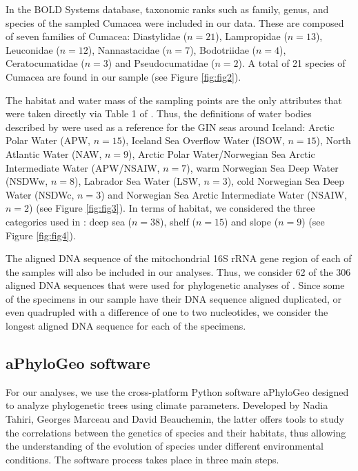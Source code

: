 In the BOLD Systems database, taxonomic ranks such as family, genus, and species of the sampled Cumacea were included in our data. These are composed of seven families of Cumacea: Diastylidae (\( n=21 \)), Lampropidae (\( n=13 \)), Leuconidae (\( n=12 \)), Nannastacidae (\( n=7 \)), Bodotriidae (\( n=4 \)), Ceratocumatidae (\( n=3 \)) and Pseudocumatidae (\( n=2 \)). A total of 21 species of Cumacea are found in our sample (see Figure \ref{fig:fig2}).

The habitat and water mass of the sampling points are the only attributes that were taken directly via Table 1 of \citep{uhlir_adding_2021}. Thus, the definitions of water bodies described by \citep{ostmann_marine_2014} were used as a reference for the GIN seas around Iceland: Arctic Polar Water (APW, \( n=15 \)), Iceland Sea Overflow Water (ISOW, \( n=15 \)), North Atlantic Water (NAW, \( n=9 \)), Arctic Polar Water/Norwegian Sea Arctic Intermediate Water (APW/NSAIW, \( n=7 \)), warm Norwegian Sea Deep Water (NSDWw, \( n=8 \)), Labrador Sea Water (LSW, \( n=3 \)), cold Norwegian Sea Deep Water (NSDWc, \( n=3 \)) and Norwegian Sea Arctic Intermediate Water (NSAIW, \( n=2 \)) (see Figure \ref{fig:fig3}). In terms of habitat, we considered the three categories used in \citep{uhlir_adding_2021}: deep sea (\( n=38 \)), shelf (\( n=15 \)) and slope (\( n=9 \)) (see Figure \ref{fig:fig4}).

The aligned DNA sequence of the mitochondrial 16S rRNA gene region of each of the samples will also be included in our analyses. Thus, we consider 62 of the 306 aligned DNA sequences that were used for phylogenetic analyses of \citep{uhlir_adding_2021}. Since some of the specimens in our sample have their DNA sequence aligned duplicated, or even quadrupled with a difference of one to two nucleotides, we consider the longest aligned DNA sequence for each of the specimens.

\subsection{aPhyloGeo software}

For our analyses, we use the cross-platform Python software aPhyloGeo designed to analyze phylogenetic trees using climate parameters. Developed by Nadia Tahiri, Georges Marceau and David Beauchemin, the latter offers tools to study the correlations between the genetics of species and their habitats, thus allowing the understanding of the evolution of species under different environmental conditions. The software process takes place in three main steps. 

